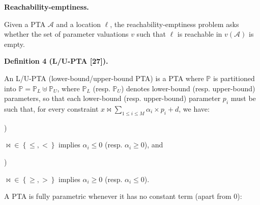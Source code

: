 \documentclass[10pt,a4paper]{article}
\begin{document}
 
 
\par\medskip\noindent\textbf{Reachability-emptiness.}\par
 
 
Given a PTA $\mathcal{A}$ and a location $\mathrm{\ell}$, the reachability-emptiness problem asks whether the set of parameter valuations $v$ such that $\mathrm{\ell}$ is reachable in $v(\mathcal{A})$ is empty.\par
 
 
 
\par\medskip\noindent\textbf{Definition 4 (L/U-PTA [27]).}\par
 
 
An L/U-PTA (lower-bound/upper-bound PTA) is a PTA where $\mathbb{P}$ is partitioned into $\mathbb{P}=\mathbb{P}_{L}\uplus\mathbb{P}_{U}$, where $\mathbb{P}_{L}$ (resp. $\mathbb{P}_{U}$) denotes lower-bound (resp. upper-bound) parameters, so that each lower-bound (resp. upper-bound) parameter $p_{i}$ must be such that, for every constraint $x\bowtie\sum_{1\leq i\leq M}\alpha_{i}\times p_{i}+d$, we have:\par
  
\par{}) 
 
${\bowtie}\in\left\{\leq,<\right\}$ implies $\alpha_{i}\leq 0$ (resp. $\alpha_{i}\geq 0$), and\par
 
 
 
\par{}) 
 
${\bowtie}\in\left\{\geq,>\right\}$ implies $\alpha_{i}\geq 0$ (resp. $\alpha_{i}\leq 0$).\par
 
 
  
 
 
 
A PTA is fully parametric whenever it has no constant term (apart from 0):\par
 
\end{document}
